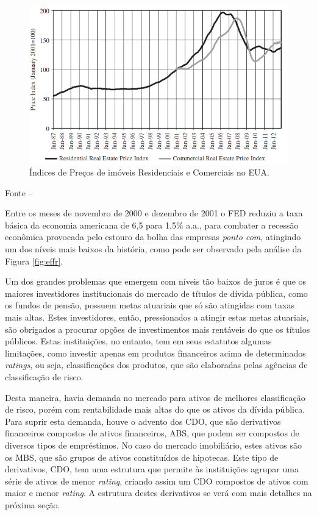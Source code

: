 \documentclass[
	12pt,				%
	oneside,			%
	a4paper,			%
	chapter=TITLE,		%
	section=TITLE,		%
	english,			%
	brazil				%
	]{abntex2}
\newcommand{\bcenter}{\begin{center}}
\newcommand{\ecenter}{\end{center}}
\begin{document}
\begin{refsection}
\begin{figure}[H]
{\centering \includegraphics[width=0.7\linewidth]{images/HPI_RCA_CPPI} 

}

\caption{Índices de Preços de imóveis Residenciais e Comerciais no EUA.}\label{fig:unnamed-chunk-19}
\end{figure}
\bcenter

Fonte -- \textcite[p.~85]{levitin2013}
\ecenter

Entre os meses de novembro de 2000 e dezembro de 2001 o \gls{FED} reduziu a taxa
básica da economia americana de 6,5 para 1,5\% a.a., para combater a recessão
econômica provocada pelo estouro da bolha das empresas \emph{ponto com}, atingindo um
dos níveis mais baixos da história, como pode ser observado pela análise da
Figura \ref{fig:effr}.

Um dos grandes problemas que emergem com níveis tão baixos de juros é que os
maiores investidores institucionais do mercado de títulos de dívida pública,
como os fundos de pensão, possuem metas atuariais que só são atingidas com taxas
mais altas. Estes investidores, então, pressionados a atingir estas metas
atuariais, são obrigados a procurar opções de investimentos mais rentáveis do
que os títulos públicos. Estas instituições, no entanto, tem em seus estatutos
algumas limitações, como investir apenas em produtos financeiros acima de
determinados \emph{ratings}, ou seja, classificações dos produtos, que são elaboradas
pelas agências de classificação de risco.

Desta maneira, havia demanda no mercado para ativos de melhores classificação de
risco, porém com rentabilidade mais altas do que os ativos da dívida pública.
Para suprir esta demanda, houve o advento dos \gls{CDO}, que são derivativos
financeiros compostos de ativos financeiros, \gls{ABS}, que podem ser compostos
de diversos tipos de empréstimos. No caso do mercado imobiliário, estes ativos
são os \gls{MBS}, que são grupos de ativos constituídos de hipotecas. Este tipo
de derivativos, \gls{CDO}, tem uma estrutura que permite às instituições agrupar
uma série de ativos de menor \emph{rating}, criando assim um \gls{CDO} compostos de
ativos com maior e menor \emph{rating}. A estrutura destes derivativos se verá com
mais detalhes na próxima seção.


\end{refsection}
\end{document}
